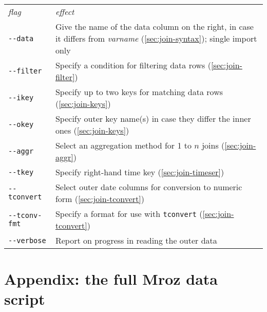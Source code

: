 \begin{center}
\begin{tabular}{lp{}}
  \textit{flag} & \textit{effect} \\ [6pt]
  \verb|--data| & Give the name of the data column on the right, in
                  case it differs from \textsl{varname}
                  (\ref{sec:join-syntax}); single import only  \\
  \verb|--filter| & Specify a condition for filtering data rows
                    (\ref{sec:join-filter}) \\
  \verb|--ikey| & Specify up to two keys for matching data rows
                  (\ref{sec:join-keys}) \\
  \verb|--okey| & Specify outer key name(s) in case they
                  differ the inner ones (\ref{sec:join-keys})\\
  \verb|--aggr| & Select an aggregation method for 1 to $n$ joins
                 (\ref{sec:join-aggr}) \\ 
  \verb|--tkey| & Specify right-hand time key (\ref{sec:join-timeser}) \\
  \verb|--tconvert| & Select outer date columns for conversion to
                      numeric form (\ref{sec:join-tconvert}) \\
  \verb|--tconv-fmt| & Specify a format for use with \texttt{tconvert} 
                       (\ref{sec:join-tconvert}) \\
  \verb|--verbose| & Report on progress in reading the outer data
\end{tabular}
\end{center}


\pagebreak[4]

\section*{Appendix: the full Mroz data script}

